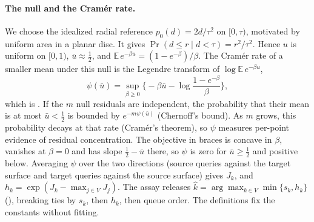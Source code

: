 \paragraph{The null and the Cram\'er rate.} We choose the idealized radial reference $p_0(d)=2d/\tau^2$ on $[0,\tau)$, motivated by uniform area in a planar disc. It gives $\Pr(d\le r\mid d<\tau)=r^2/\tau^2$. Hence $u$ is uniform on $[0,1)$, $\bar u\approx\frac12$, and $\mathbb{E}\,e^{-\beta u}=(1-e^{-\beta})/\beta$. The Cram\'er rate of a smaller mean under this null is the Legendre transform of $\log\mathbb{E}\,e^{-\beta u}$,
\begin{equation}
\psi(\bar u)=\sup_{\beta\ge0}\Big\{-\beta\bar u-\log\frac{1-e^{-\beta}}{\beta}\Big\},
\label{S-eq:s-psi}
\end{equation}
which is . If the $m$ null residuals are independent, the probability that their mean is at most $\bar u<\frac12$ is bounded by $e^{-m\psi(\bar u)}$ (Chernoff's bound). As $m$ grows, this probability decays at that rate (Cram\'er's theorem), so $\psi$ measures per-point evidence of residual concentration. The objective in braces is concave in $\beta$, vanishes at $\beta=0$ and has slope $\frac12-\bar u$ there, so $\psi$ is zero for $\bar u\ge\frac12$ and positive below. Averaging $\psi$ over the two directions (source queries against the target surface and target queries against the source surface) gives $J_k$, and $h_k=\exp(J_k-\max_{j\in V}J_j)$. The assay releases $\hat k=\arg\max_{k\in V}\min\{s_k,h_k\}$ (), breaking ties by $s_k$, then $h_k$, then queue order. The definitions fix the constants without fitting.

